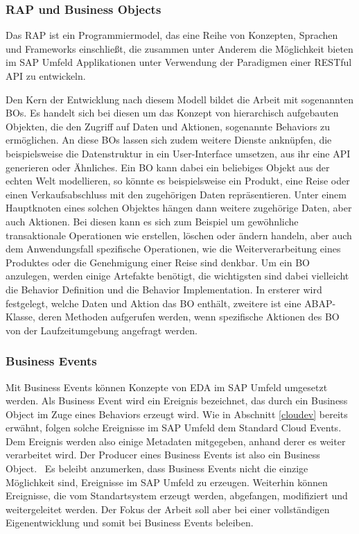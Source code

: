 \subsubsection*{RAP und Business Objects}
Das \acl{RAP} ist ein Programmiermodel, das eine Reihe von Konzepten, Sprachen und Frameworks einschließt, die zusammen unter Anderem die Möglichkeit bieten im SAP Umfeld Applikationen unter Verwendung der Paradigmen einer \ac*{REST}ful \ac{API} zu entwickeln. \cite[Vgl.][]{sapse_rap} 

Den Kern der Entwicklung nach diesem Modell bildet die Arbeit mit sogenannten \ac{BO}s. Es handelt sich bei diesen um das Konzept von hierarchisch aufgebauten Objekten, die den Zugriff auf Daten und Aktionen, sogenannte Behaviors zu ermöglichen. An diese \ac{BO}s lassen sich zudem weitere Dienste anknüpfen, die beispielsweise die Datenstruktur in ein User-Interface umsetzen, aus ihr eine \ac{API} generieren oder Ähnliches. Ein \ac{BO} kann dabei ein beliebiges Objekt aus der echten Welt modellieren, so könnte es beispielsweise ein Produkt, eine Reise oder einen Verkaufsabschluss mit den zugehörigen Daten repräsentieren. Unter einem Hauptknoten eines solchen Objektes hängen dann weitere zugehörige Daten, aber auch Aktionen. Bei diesen kann es sich zum Beispiel um gewöhnliche transaktionale Operationen wie erstellen, löschen oder ändern handeln, aber auch dem Anwendungsfall spezifische Operationen, wie die Weiterverarbeitung eines Produktes oder die Genehmigung einer Reise sind denkbar. Um ein \ac{BO} anzulegen, werden einige Artefakte benötigt, die wichtigsten sind dabei vielleicht die Behavior Definition und die Behavior Implementation. In ersterer wird festgelegt, welche Daten und Aktion das \ac{BO} enthält, zweitere ist eine \ac{ABAP}-Klasse, deren Methoden aufgerufen werden, wenn spezifische Aktionen des \ac{BO} von der Laufzeitumgebung angefragt werden. \cite[Vgl.][]{sapse_rap}

\subsubsection*{Business Events}
Mit Business Events können Konzepte von \ac{EDA} im SAP Umfeld umgesetzt werden. Als Business Event wird ein Ereignis bezeichnet, das durch ein Business Object im Zuge eines Behaviors erzeugt wird. Wie in Abschnitt \ref{cloudev} bereits erwähnt, folgen solche Ereignisse im SAP Umfeld dem Standard Cloud Events. Dem Ereignis werden also einige Metadaten mitgegeben, anhand derer es weiter verarbeitet wird. Der Producer eines Business Events ist also ein Business Object.\ \cite[Vgl.][]{sapse_bes} Es beleibt anzumerken, dass Business Events nicht die einzige Möglichkeit sind, Ereignisse im SAP Umfeld zu erzeugen. Weiterhin können Ereignisse, die vom Standartsystem erzeugt werden, abgefangen, modifiziert und weitergeleitet werden. Der Fokus der Arbeit soll aber bei einer vollständigen Eigenentwicklung und somit bei Business Events beleiben.

